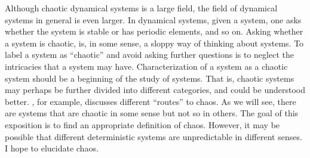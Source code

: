 \documentclass[10pt,twoside]{book}
\begin{document}
Although chaotic dynamical systems is a large field, the field of dynamical systems in general is even larger.
In dynamical systems, given a system, one asks whether the system is stable or has periodic elements, and so on.
Asking whether a system is chaotic, is, in some sense, a sloppy way of thinking about systems.
To label a system as ``chaotic'' and avoid asking further questions is to neglect the intricacies that a system may have.
Characterization of a system as a chaotic system should be a beginning of the study of systems.
That is, chaotic systems may perhaps be further divided into different categories, and could be understood better.
\citet{devaney}, for example, discusses different ``routes'' to chaos.
As we will see, there are systems that are chaotic in some sense but not so in others.
The goal of this exposition is to find an appropriate definition of chaos.
However, it may be possible that different deterministic systems are unpredictable in different senses.
I hope to elucidate chaos.



\end{document}
